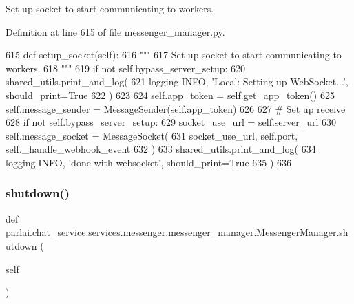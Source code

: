 \begin{DoxyVerb}Set up socket to start communicating to workers.
\end{DoxyVerb}
 

Definition at line 615 of file messenger\+\_\+manager.\+py.


\begin{DoxyCode}
615     \textcolor{keyword}{def }setup\_socket(self):
616         \textcolor{stringliteral}{"""}
617 \textcolor{stringliteral}{        Set up socket to start communicating to workers.}
618 \textcolor{stringliteral}{        """}
619         \textcolor{keywordflow}{if} \textcolor{keywordflow}{not} self.bypass\_server\_setup:
620             shared\_utils.print\_and\_log(
621                 logging.INFO, \textcolor{stringliteral}{'Local: Setting up WebSocket...'}, should\_print=\textcolor{keyword}{True}
622             )
623 
624         self.app\_token = self.get\_app\_token()
625         self.message\_sender = MessageSender(self.app\_token)
626 
627         \textcolor{comment}{# Set up receive}
628         \textcolor{keywordflow}{if} \textcolor{keywordflow}{not} self.bypass\_server\_setup:
629             socket\_use\_url = self.server\_url
630             self.message\_socket = MessageSocket(
631                 socket\_use\_url, self.port, self.\_handle\_webhook\_event
632             )
633         shared\_utils.print\_and\_log(
634             logging.INFO, \textcolor{stringliteral}{'done with websocket'}, should\_print=\textcolor{keyword}{True}
635         )
636 
\end{DoxyCode}
\mbox{\label{classparlai_1_1chat__service_1_1services_1_1messenger_1_1messenger__manager_1_1MessengerManager_ab6879d8a8fd1f897cf3dba904a11c4c0}} 
\subsubsection{\texorpdfstring{shutdown()}{shutdown()}}
{\footnotesize\ttfamily def parlai.\+chat\+\_\+service.\+services.\+messenger.\+messenger\+\_\+manager.\+Messenger\+Manager.\+shutdown (\begin{DoxyParamCaption}\item[{}]{self }\end{DoxyParamCaption})}

